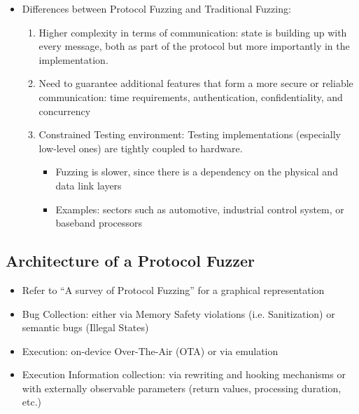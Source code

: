 \documentclass[a4paper,11pt,oneside]{report}
\begin{document}
\begin{itemize}
  \item Differences between Protocol Fuzzing and Traditional Fuzzing:
  \begin{enumerate}
    \item Higher complexity in terms of communication: state is building up with every message, both as part of the protocol but more importantly in the implementation.
    \item Need to guarantee additional features that form a more secure or reliable communication: time requirements, authentication, confidentiality, and concurrency
    \item Constrained Testing environment: Testing implementations (especially low-level ones) are tightly coupled to hardware.
    \begin{itemize}
      \item Fuzzing is slower, since there is a dependency on the physical and data link layers
      \item Examples: sectors such as automotive, industrial control system, or baseband processors
    \end{itemize}
  \end{enumerate}
\end{itemize}

\subsection{Architecture of a Protocol Fuzzer}
\begin{itemize}
  \item Refer to \enquote{A survey of Protocol Fuzzing} for a graphical representation
  \item Bug Collection: either via Memory Safety violations (i.e. Sanitization) or semantic bugs (Illegal States)
  \item Execution: on-device Over-The-Air (OTA) or via emulation
  \item Execution Information collection: via rewriting and hooking mechanisms or with externally observable parameters (return values, processing duration, etc.)
\end{itemize}
\end{document}
